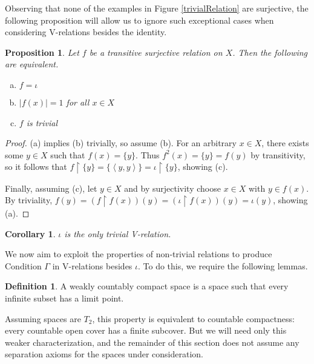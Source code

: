 \documentclass{article}
\newcommand{\tuple}[1]{\left\langle{#1}\right\rangle}
\newcommand{\rest}{\upharpoonright}
\theoremstyle{plain}
\newtheorem{corollary}[theorem]{Corollary}
\newtheorem{proposition}[theorem]{Proposition}
\theoremstyle{definition}
\newtheorem{definition}[theorem]{Definition}
\theoremstyle{remark}
\begin{document}
Observing that none of the examples in Figure \ref{trivialRelation}
are surjective, the following proposition will allow us to ignore
such exceptional cases when considering V-relations besides the identity. 

\begin{proposition}
  Let \(f\) be a transitive surjective relation on \(X\).
  Then the following are equivalent.
  \begin{enumerate}[a)]
  \item \(f=\iota\)
  \item \(|f(x)|=1\) for all \(x\in X\)
  \item \(f\) is trivial
  \end{enumerate}
\end{proposition}
\begin{proof}
  (a) implies (b) trivially, so assume (b). For an arbitrary \(x\in X\),
  there exists some \(y\in X\) such that \(f(x)=\{y\}\). 
  Thus \(f^2(x)=\{y\}=f(y)\) by transitivity, so it follows that 
  \(f\rest\{y\}=\{\tuple{y,y}\}=\iota\rest\{y\}\), showing (c).

  Finally, assuming (c), let \(y\in X\) and by surjectivity choose
  \(x\in X\) with \(y\in f(x)\). By triviality,
  \(f(y)=(f\rest f(x))(y)=(\iota\rest f(x))(y)=\iota(y)\),
  showing (a).
\end{proof}

\begin{corollary}
  \(\iota\) is the only trivial V-relation.
\end{corollary}

We now aim to exploit the properties of non-trivial relations
to produce Condition \(\Gamma\) in V-relations besides \(\iota\).
To do this, we require the following lemmas.

\begin{definition}
A weakly countably compact space is a space such that every infinite
subset has a limit point.
\end{definition}

Assuming spaces are \(T_2\), this property is equivalent
to countable compactness: every countable open cover has a finite subcover.
But we will need only this weaker characterization, and the remainder
of this section does not assume any separation axioms for the spaces under
consideration.
\end{document}
